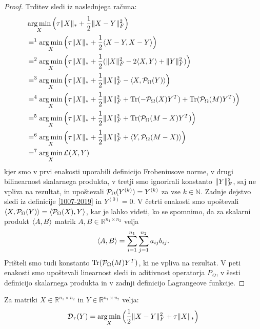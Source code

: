 \begin{proof}
Trditev sledi iz naslednjega računa:
\begin{align*}
    &\operatorname*{arg\,min}_X  \Big(\tau\lVert X\rVert_* + \frac{1}{2}\lVert X - Y\rVert_F^2\Big) \\
    &=^1\operatorname*{arg\,min}_X \Big(\tau\lVert X\rVert_* + \frac{1}{2}\langle X - Y, X - Y \rangle\Big)\\
    &=^2\operatorname*{arg\,min}_X \Big(\tau\lVert X\rVert_* + \frac{1}{2}(\lVert X\rVert_F^2 - 2\langle X, Y \rangle + \lVert Y\rVert_F^2)\Big) \\ 
    &=^3\operatorname*{arg\,min}_X \Big(\tau\lVert X\rVert_* + \frac{1}{2}\lVert X\rVert_F^2 - \langle X, \mathcal{P}_\Omega(Y) \rangle\Big)\\
    &=^4\operatorname*{arg\,min}_X \Big(\tau\lVert X\rVert_* + \frac{1}{2}\lVert X\rVert_F^2 + \operatorname{Tr}(- \mathcal{P}_\Omega(X)Y^T) + \operatorname{Tr}(\mathcal{P}_\Omega(M)Y^T)\Big)\\
    &=^5\operatorname*{arg\,min}_X \Big(\tau\lVert X\rVert_* + \frac{1}{2}\lVert X\rVert_F^2 + \operatorname{Tr}(\mathcal{P}_\Omega(M - X)Y^T)\Big)\\
    &=^6\operatorname*{arg\,min}_X \Big(\tau\lVert X\rVert_* + \frac{1}{2}\lVert X\rVert_F^2 + \langle Y, \mathcal{P}_\Omega(M - X) \rangle\Big)\\ 
    &=^7 \operatorname*{arg\,min}_X \mathcal{L}(X, Y)
\end{align*}
kjer smo v prvi enakosti uporabili definicijo Frobeniusove norme, v drugi bilinearnost skalarnega produkta, 
v tretji smo ignorirali konstanto $\lVert Y\rVert_F^2$, saj ne vpliva na rezultat, 
in upoštevali $\mathcal{P}_\Omega(Y^{(k)}) = Y^{(k)}$ za vse $k \in \mathbb{N}$. Zadnje dejstvo sledi iz definicije \eqref{1007-2019} in $Y^{(0)} = 0$. V četrti enakosti smo upoštevali $\langle X, \mathcal{P}_\Omega(Y) \rangle = \langle \mathcal{P}_\Omega(X), Y \rangle$, kar je lahko videti, ko se spomnimo, da za skalarni produkt $\langle A, B \rangle$ matrik $A, B \in \mathbb{R}^{n_1 \times n_2}$ velja 
\[
    \langle A, B \rangle = \sum_{i = 1}^{n_1}\sum_{j = 1}^{n_2} a_{ij}b_{ij}.
\]
Prišteli smo tudi konstanto $\operatorname{Tr}(\mathcal{P}_\Omega(M)Y^T)$, ki ne vpliva na rezultat.
V peti enakosti smo upoštevali linearnost sledi in aditivnost operatorja $P_\Omega$,
v šesti definicijo skalarnega produkta in v zadnji definicijo Lagrangeove funkcije.
\end{proof}
\begin{theorem} \label{1907-2240}
Za matriki $X \in \mathbb{R}^{n_1 \times n_2}$ in 
$Y \in \mathbb{R}^{n_1 \times n_2}$ velja:
\begin{align}
    \label{2906-1056}
    \mathcal{D}_\tau(Y) = \operatorname*{arg\,min}_{X} \Big(\frac{1}{2} \lVert X-Y\rVert_F^2 + \tau\lVert X\rVert_* \Big) 
\end{align}
\end{theorem}

